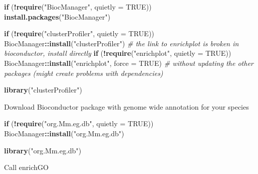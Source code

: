 \documentclass[
]{article}
\newenvironment{Shaded}{\begin{snugshade}}{\end{snugshade}}
\newcommand{\AttributeTok}[1]{\textcolor[rgb]{0.13,0.29,0.53}{#1}}
\newcommand{\CommentTok}[1]{\textcolor[rgb]{0.56,0.35,0.01}{\textit{#1}}}
\newcommand{\ConstantTok}[1]{\textcolor[rgb]{0.56,0.35,0.01}{#1}}
\newcommand{\ControlFlowTok}[1]{\textcolor[rgb]{0.13,0.29,0.53}{\textbf{#1}}}
\newcommand{\FunctionTok}[1]{\textcolor[rgb]{0.13,0.29,0.53}{\textbf{#1}}}
\newcommand{\NormalTok}[1]{#1}
\newcommand{\SpecialCharTok}[1]{\textcolor[rgb]{0.81,0.36,0.00}{\textbf{#1}}}
\newcommand{\StringTok}[1]{\textcolor[rgb]{0.31,0.60,0.02}{#1}}
\begin{document}
\begin{Shaded}
\begin{Highlighting}[]
\ControlFlowTok{if}\NormalTok{ (}\SpecialCharTok{!}\FunctionTok{require}\NormalTok{(}\StringTok{"BiocManager"}\NormalTok{, }\AttributeTok{quietly =} \ConstantTok{TRUE}\NormalTok{))}
  \FunctionTok{install.packages}\NormalTok{(}\StringTok{"BiocManager"}\NormalTok{)}

\ControlFlowTok{if}\NormalTok{ (}\SpecialCharTok{!}\FunctionTok{require}\NormalTok{(}\StringTok{"clusterProfiler"}\NormalTok{, }\AttributeTok{quietly =} \ConstantTok{TRUE}\NormalTok{))}
\NormalTok{  BiocManager}\SpecialCharTok{::}\FunctionTok{install}\NormalTok{(}\StringTok{"clusterProfiler"}\NormalTok{)}
\CommentTok{\# the link to enrichplot is broken in bioconductor, install directly }
\ControlFlowTok{if}\NormalTok{ (}\SpecialCharTok{!}\FunctionTok{require}\NormalTok{(}\StringTok{"enrichplot"}\NormalTok{, }\AttributeTok{quietly =} \ConstantTok{TRUE}\NormalTok{))}
\NormalTok{  BiocManager}\SpecialCharTok{::}\FunctionTok{install}\NormalTok{(}\StringTok{"enrichplot"}\NormalTok{, }\AttributeTok{force =} \ConstantTok{TRUE}\NormalTok{) }
\CommentTok{\# without updating the other packages (might create problems with dependencies)}

\FunctionTok{library}\NormalTok{(}\StringTok{"clusterProfiler"}\NormalTok{)}
\end{Highlighting}
\end{Shaded}

Download Bioconductor package with genome wide annotation for your
species

\begin{Shaded}
\begin{Highlighting}[]
\ControlFlowTok{if}\NormalTok{ (}\SpecialCharTok{!}\FunctionTok{require}\NormalTok{(}\StringTok{"org.Mm.eg.db"}\NormalTok{, }\AttributeTok{quietly =} \ConstantTok{TRUE}\NormalTok{))}
\NormalTok{  BiocManager}\SpecialCharTok{::}\FunctionTok{install}\NormalTok{(}\StringTok{"org.Mm.eg.db"}\NormalTok{)}

\FunctionTok{library}\NormalTok{(}\StringTok{"org.Mm.eg.db"}\NormalTok{)}
\end{Highlighting}
\end{Shaded}

Call enrichGO
\end{document}
